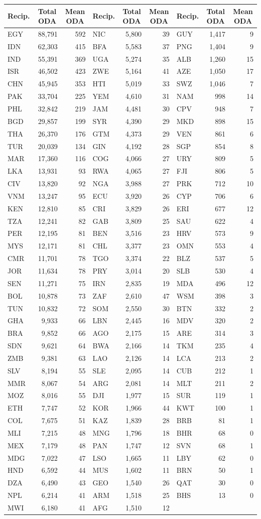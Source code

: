 %
\begin{tabular*}{\textwidth}{@{\extracolsep{\fill}}|lrr|lrr|lrr|}\hline\hline
\multicolumn{1}{l}{Recip.}&\multicolumn{1}{c}{Total ODA}&\multicolumn{1}{c}{Mean ODA}&\multicolumn{1}{l}{Recip.}&\multicolumn{1}{c}{Total ODA}&\multicolumn{1}{c}{Mean ODA}&\multicolumn{1}{l}{Recip.}&\multicolumn{1}{c}{Total ODA}&\multicolumn{1}{c}{Mean ODA}\tabularnewline
\hline
EGY&88,791&592&NIC& 5,800& 39&GUY& 1,417&  9\tabularnewline
IDN&62,303&415&BFA& 5,583& 37&PNG& 1,404&  9\tabularnewline
IND&55,391&369&UGA& 5,274& 35&ALB& 1,260& 15\tabularnewline
ISR&46,502&423&ZWE& 5,164& 41&AZE& 1,050& 17\tabularnewline
CHN&45,945&353&HTI& 5,019& 33&SWZ& 1,046&  7\tabularnewline
PAK&33,704&225&YEM& 4,610& 31&NAM&   998& 14\tabularnewline
PHL&32,842&219&JAM& 4,481& 30&CPV&   948&  7\tabularnewline
BGD&29,857&199&SYR& 4,390& 29&MKD&   898& 15\tabularnewline
THA&26,370&176&GTM& 4,373& 29&VEN&   861&  6\tabularnewline
TUR&20,039&134&GIN& 4,192& 28&SGP&   854&  8\tabularnewline
MAR&17,360&116&COG& 4,066& 27&URY&   809&  5\tabularnewline
LKA&13,931& 93&RWA& 4,065& 27&FJI&   806&  5\tabularnewline
CIV&13,820& 92&NGA& 3,988& 27&PRK&   712& 10\tabularnewline
VNM&13,247& 95&ECU& 3,920& 26&CYP&   706&  6\tabularnewline
KEN&12,810& 85&CRI& 3,829& 26&ERI&   677& 12\tabularnewline
TZA&12,241& 82&GAB& 3,809& 25&SAU&   622&  4\tabularnewline
PER&12,195& 81&BEN& 3,516& 23&HRV&   573&  9\tabularnewline
MYS&12,171& 81&CHL& 3,377& 23&OMN&   553&  4\tabularnewline
CMR&11,701& 78&TGO& 3,374& 22&BLZ&   537&  5\tabularnewline
JOR&11,634& 78&PRY& 3,014& 20&SLB&   530&  4\tabularnewline
SEN&11,271& 75&IRN& 2,835& 19&MDA&   496& 12\tabularnewline
BOL&10,878& 73&ZAF& 2,610& 47&WSM&   398&  3\tabularnewline
TUN&10,832& 72&SOM& 2,550& 30&BTN&   332&  2\tabularnewline
GHA& 9,933& 66&LBN& 2,445& 16&MDV&   320&  2\tabularnewline
BRA& 9,852& 66&AGO& 2,175& 15&ARE&   314&  3\tabularnewline
SDN& 9,621& 64&BWA& 2,166& 14&TKM&   235&  4\tabularnewline
ZMB& 9,381& 63&LAO& 2,126& 14&LCA&   213&  2\tabularnewline
SLV& 8,194& 55&SLE& 2,095& 14&CUB&   212&  1\tabularnewline
MMR& 8,067& 54&ARG& 2,081& 14&MLT&   211&  2\tabularnewline
MOZ& 8,016& 55&DJI& 1,977& 15&SUR&   119&  1\tabularnewline
ETH& 7,747& 52&KOR& 1,966& 44&KWT&   100&  1\tabularnewline
COL& 7,675& 51&KAZ& 1,839& 28&BRB&    81&  1\tabularnewline
MLI& 7,215& 48&MNG& 1,796& 18&BHR&    68&  0\tabularnewline
MEX& 7,179& 48&PAN& 1,747& 12&SVN&    68&  1\tabularnewline
MDG& 7,022& 47&LSO& 1,665& 11&LBY&    62&  0\tabularnewline
HND& 6,592& 44&MUS& 1,602& 11&BRN&    50&  1\tabularnewline
DZA& 6,490& 43&GEO& 1,540& 26&QAT&    30&  0\tabularnewline
NPL& 6,214& 41&ARM& 1,518& 25&BHS&    13&  0\tabularnewline
MWI& 6,180& 41&AFG& 1,510& 12&&&\tabularnewline
\hline
\end{tabular*}

